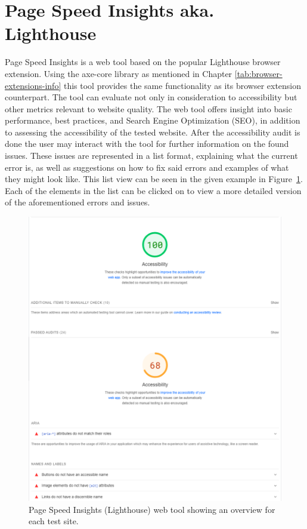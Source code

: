\section{Page Speed Insights aka. Lighthouse}

Page Speed Insights \parencite{PSIL} is a web tool based on the popular Lighthouse browser extension. Using the axe-core library as mentioned in Chapter \ref{tab:browser-extensions-info} this tool provides the same functionality as its browser extension counterpart. The tool can evaluate not only in consideration to accessibility but other metrics relevant to website quality. The web tool offers insight into basic performance, best practices, and Search Engine Optimization (SEO), in addition to assessing the accessibility of the tested website. After the accessibility audit is done the user may interact with the tool for further information on the found issues. These issues are represented in a list format, explaining what the current error is, as well as suggestions on how to fix said errors and examples of what they might look like. This list view can be seen in the given example in Figure~\ref{fig:PSIL}. Each of the elements in the list can be clicked on to view a more detailed version of the aforementioned errors and issues. 

\begin{figure}[tp]
\centering
\includegraphics[keepaspectratio,width=\linewidth,height=\halfh]
{images/lighthouse.png}

\caption[Page Speed Insights Overview]
{%
Page Speed Insights (Lighthouse) web tool showing an overview for each test site.
}
\label{fig:PSIL}
\end{figure}




